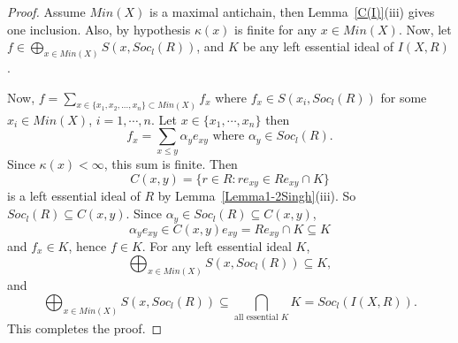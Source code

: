 \documentclass[12pt]{article}
\begin{document}
\begin{proof}
Assume $Min(X)$ is a maximal antichain, then Lemma~\ref{C(I)}(iii) gives one inclusion. Also, by hypothesis $\kappa(x)$ is finite for any $x\in Min(X)$. Now, let $f\in \bigoplus_{x \in Min(X)} S(x,Soc_l(R))$, and $K$ be any left essential ideal of $I(X,R)$. %

Now, $\displaystyle f=\sum_{x \in  \{x_1,x_2, ..., x_n \} \subset Min(X)}f_{x}$ where $f_{x}\in S(x_{i},Soc_{l}(R))$ for
some $x_{i}\in Min(X)$, $i=1,\cdots ,n$. Let $x\in \{x_{1},\cdots,x_{n}\} $ then 
\begin{equation*}
f_{x}=\sum_{x\leq y} \alpha_{y}e_{xy}\text{ where }%
\alpha_{y}\in Soc_{l}(R).
\end{equation*}%
Since $\kappa(x)< \infty$, this sum is finite. Then 
\begin{equation*}
C(x,y)=\{r\in R: re_{xy}\in Re_{xy}\cap K \} 
\end{equation*} is a left essential ideal of $R$ by Lemma~\ref{Lemma1-2Singh}(iii). So $ Soc_{l}(R)\subseteq C(x,y)$. 
Since $\alpha_{y}\in Soc_{l}(R)\subseteq C(x,y)$, 
\begin{equation*}
\alpha_{y}e_{xy}\in C(x,y)e_{xy}=Re_{xy}\cap K\subseteq K
\end{equation*}
and $f_{x}\in K$, hence $f\in K$. For any left essential ideal $K$, 
\begin{equation*}
\bigoplus_{x \in Min(X)} S(x,Soc_l(R))\subseteq  K, 
\end{equation*}
and
\begin{equation*}
 \bigoplus_{x \in Min(X)} S(x,Soc_l(R))\subseteq \bigcap_{ \mbox{all essential } K} K = Soc_l({I(X,R)}).  
\end{equation*}
This completes the proof. 
\end{proof}
\end{document}

